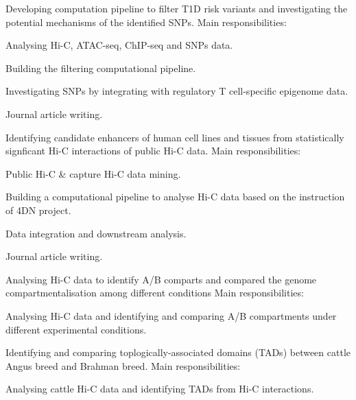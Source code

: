 \documentclass[]{deedy-resume-openfont}
\begin{document}
Developing computation pipeline to filter T1D risk variants and investigating the potential mechanisms of the identified SNPs.
Main responsibilities:
\begin{tightemize}
\item Analysing Hi-C, ATAC-seq, ChIP-seq and SNPs data.
\item Building the filtering computational pipeline.
\item Investigating SNPs by integrating with regulatory T cell-specific epigenome data.
\item Journal article writing.
\end{tightemize}
\sectionsep

Identifying candidate enhancers of human cell lines and tissues from statistically signficant Hi-C interactions of public Hi-C data.
Main responsibilities:
\begin{tightemize}
\item Public Hi-C \& capture Hi-C data mining.
\item Building a computational pipeline to analyse Hi-C data based on the instruction of 4DN project.
\item Data integration and downstream analysis.
\item Journal article writing.
\end{tightemize}
\sectionsep

Analysing Hi-C data to identify A/B comparts and compared the genome compartmentalisation among different conditions
Main responsibilities:
\begin{tightemize}
\item Analysing Hi-C data and identifying and comparing A/B compartments under different experimental conditions.
\end{tightemize}
\sectionsep

Identifying and comparing toplogically-associated domains (TADs) between cattle Angus breed and Brahman breed.
Main responsibilities:
\begin{tightemize}
\item Analysing cattle Hi-C data and identifying TADs from Hi-C interactions.
\end{tightemize}
\sectionsep
\end{document}
